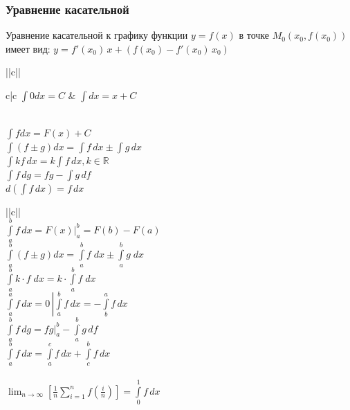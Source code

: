 \subsubsection{Уравнение касательной}
Уравнение касательной к графику функции $\displaystyle y = f(x) $ в точке $\displaystyle M_0(x_0, f(x_0)) $ имеет вид:
$ y = f'(x_0)\, x + (f(x_0) - f'(x_0)\, x_0) $
\begin{tabu}[t]{||c||}
	\hline
		 \\
	\hline
	\hline
		\begin{tabu}[t]{c|c}
		$ \int 0 dx = C $ &
		$ \int dx = x + C $
		\end{tabu} \\
	\hline
		$ \int f dx = F(x) + C $ \\
	\hline
		$ \int (f\pm g) dx = \int f\,dx \pm \int g\,dx $ \\
	\hline
		$ \int kf\,dx = k \int f\,dx, k \in \mathbb{R} $ \\
	\hline
		$ \int f\,dg = fg - \int g\,df $ \\
	\hline
		$ d\left(\int f\,dx \right) = f\,dx $ \\
	\hline
\end{tabu}
\begin{tabu}[t]{||c||}
	\hline
		 \\
	\hline
	\hline
		$ \int\limits_a^b f\,dx = F(x)\Bigr|_a^b = F(b) - F(a) $ \\
	\hline
		$ \int\limits_a^b (f\pm g)dx = \int\limits_a^b f\;dx \pm \int\limits_a^b g\;dx  $ \\
	\hline
		$ \int\limits_a^b k\cdot f\;dx = k\cdot\int\limits_a^b f\;dx $ \\
	\hline
		$ \left. \int\limits_a^a f\,dx = 0\, \right| \int\limits_a^b f\,dx = -\int\limits_b^a f\,dx $ \\
	\hline
		$ \int\limits_a^b f\,dg = fg\Bigr|_a^b - \int\limits_a^b g\,df $ \\
	\hline
		$ \int\limits_a^b f\,dx = \int\limits_a^c f\,dx + \int\limits_c^b f\,dx$ \\
	\hline
		 \\
	\hline
		$\displaystyle \lim_{n \to \infty} \left[ \frac{1}{n} \sum_{i = 1}^{n} f\left(\frac{i}{n}\right) \right] = \int\limits_0^1 f\,dx $ \\
	\hline
		 \\
	\hline
\end{tabu}
